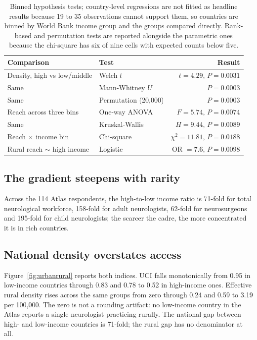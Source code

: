 \documentclass[9pt,twoside]{pnas-new}
\begin{document}
\begin{table}[H]
\centering
\caption{Binned hypothesis tests; country-level regressions are not fitted as
headline results because 19 to 35 observations cannot support them, so countries
are binned by World Bank income group and the groups compared directly. Rank-based
and permutation tests are reported alongside the parametric ones because the
chi-square has six of nine cells with expected counts below five.}
\label{tab:tests}
\begin{tabular}{llr}
\toprule
Comparison & Test & Result \\
\midrule
Density, high vs low/middle & Welch $t$ & $t = 4.29$, $P = 0.0031$ \\
\quad Same & Mann-Whitney $U$ & $P = 0.0003$ \\
\quad Same & Permutation (20{,}000) & $P = 0.0003$ \\
Reach across three bins & One-way ANOVA & $F = 5.74$, $P = 0.0074$ \\
\quad Same & Kruskal-Wallis & $H = 9.44$, $P = 0.0089$ \\
Reach $\times$ income bin & Chi-square & $\chi^2 = 11.81$, $P = 0.0188$ \\
Rural reach $\sim$ high income & Logistic & OR $= 7.6$, $P = 0.0098$ \\
\bottomrule
\end{tabular}

\end{table}

\subsection*{The gradient steepens with rarity}

Across the 114 Atlas respondents, the high-to-low income ratio is 71-fold for
total neurological workforce, 158-fold for adult neurologists, 62-fold for
neurosurgeons and 195-fold for child neurologists; the scarcer the
cadre, the more concentrated it is in rich countries.

\subsection*{National density overstates access}

Figure~\ref{fig:urbanrural} reports both indices. UCI falls monotonically from
0.95 in low-income countries through 0.83 and 0.78 to 0.52 in high-income ones.
Effective rural density rises across the same groups from zero
through 0.24 and 0.59 to 3.19 per 100{,}000. The zero is not
a rounding artifact: no low-income country in the Atlas reports a single
neurologist practicing rurally. The national gap between high- and low-income
countries is 71-fold; the rural gap has no denominator at all.
\end{document}
